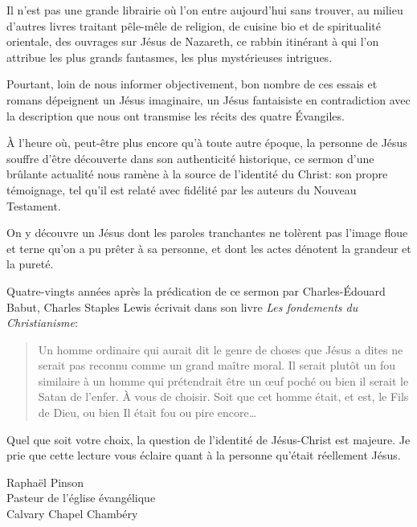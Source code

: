 
\begin{preface}
Il n'est pas une grande librairie où l'on entre aujourd'hui sans trouver,
au milieu d'autres livres traitant pêle-mêle de religion, de cuisine bio et de spiritualité orientale,
des ouvrages sur Jésus de Nazareth, ce rabbin itinérant à qui l'on attribue les plus grands
fantasmes, les plus mystérieuses intrigues.

Pourtant, loin de nous informer objectivement, bon nombre de ces essais et romans
dépeignent un Jésus imaginaire, un Jésus fantaisiste en contradiction avec
la description que nous ont transmise les récits des quatre \'Evangiles.

\`A l'heure où, peut-être plus encore qu'à toute autre époque, la personne de Jésus
souffre d'être découverte dans son authenticité historique, ce sermon d'une brûlante actualité
nous ramène à la source de l'identité du Christ: son propre témoignage,
tel qu'il est relaté avec fidélité par les auteurs du Nouveau Testament.

On y découvre un Jésus dont les paroles tranchantes ne tolèrent pas l'image
floue et terne qu'on a pu prêter à sa personne,
et dont les actes dénotent la grandeur et la pureté.

Quatre-vingts années après la prédication de ce sermon par Charles-\'Edouard Babut, Charles Staples Lewis
écrivait dans son livre \emph{Les fondements du Christianisme}:

\begin{quote}
\quotefont
Un homme ordinaire qui aurait dit le genre de choses que Jésus
a dites ne serait pas reconnu comme un grand maître moral.
Il serait plutôt un fou \ocadr similaire à un homme qui prétendrait être un œuf poché \fcadr ou bien il serait le Satan de l'enfer.
À vous de choisir. Soit que cet homme était, et est, le Fils de Dieu, ou bien Il était fou ou pire encore…
\end{quote}


Quel que soit votre choix, la question de l'identité de Jésus-Christ est majeure. Je prie que cette lecture vous éclaire quant à la personne qu'était réellement Jésus.


\begin{flushright}
Raphaël Pinson\\
Pasteur de l'église évangélique\\
Calvary Chapel Chambéry
\end{flushright}

\end{preface}


